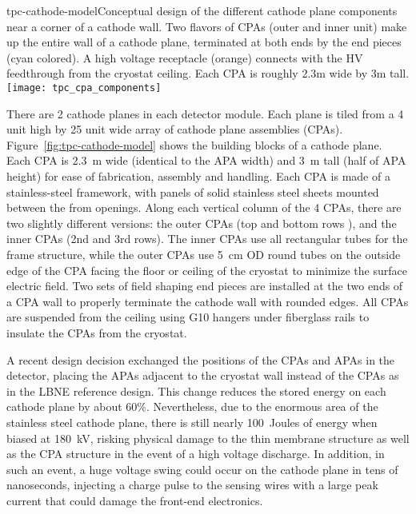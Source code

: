 \begin{cdrfigure}{tpc-cathode-model}{Conceptual design of the different cathode plane components near a corner of a cathode wall.  Two flavors of CPAs (outer and inner unit) make up the entire wall of a cathode plane, terminated at both ends by the end pieces (cyan colored).  A high voltage receptacle (orange) connects with the HV feedthrough from the cryostat ceiling. Each CPA is roughly 2.3m wide by 3m tall.}
\texttt{[image: tpc\_cpa\_components]}
\end{cdrfigure}

There are 2 cathode planes in each detector module.  Each plane is
tiled from a 4 unit high by 25 unit wide array of cathode plane
assemblies (CPAs). Figure~\ref{fig:tpc-cathode-model} shows the
building blocks of a cathode plane.  Each CPA is 2.3~m wide (identical
to the APA width) and 3~m tall (half of APA height) for ease of
fabrication, assembly and handling.  Each CPA is made of a
stainless-steel framework, with panels of solid stainless steel sheets
mounted between the from openings.  Along each vertical column of the
4 CPAs, there are two slightly different versions: the outer CPAs (top
and bottom rows ), and the inner CPAs (2nd and 3rd rows).  The inner
CPAs use all rectangular tubes for the frame structure, while the
outer CPAs use 5~cm OD round tubes on the outside edge of the CPA
facing the floor or ceiling of the cryostat to minimize the surface
electric field.  Two sets of field shaping end pieces are installed at
the two ends of a CPA wall to properly terminate the cathode wall with
rounded edges.  All CPAs are suspended from the ceiling using G10
hangers under fiberglass rails to insulate the CPAs from the cryostat.

A recent design decision exchanged the positions of the CPAs and APAs
in the detector, placing the APAs adjacent to the cryostat wall
instead of the CPAs as in the LBNE reference design.  This change
reduces the stored energy on each cathode plane by about 60\%.
Nevertheless, due to the enormous area of the stainless steel cathode
plane, there is still nearly 100~Joules of energy when biased at
180~kV, risking physical damage to the thin membrane structure as well
as the CPA structure in the event of a high voltage discharge.  In
addition, in such an event, a huge voltage swing could occur on the
cathode plane in tens of nanoseconds, injecting a charge pulse to the
sensing wires with a large peak current that could damage the
front-end electronics.

